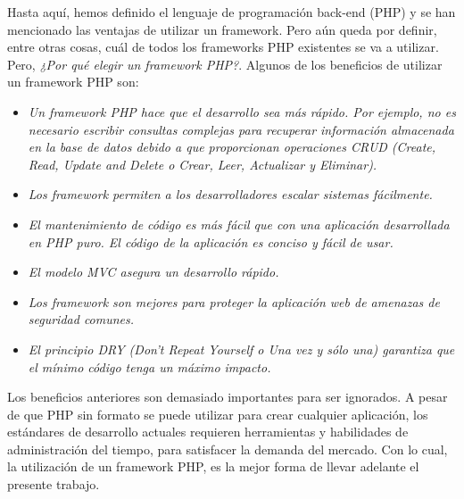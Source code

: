 \documentclass[11pt,oneside]{book}
\begin{document}
Hasta aquí, hemos definido el lenguaje de programación back-end (PHP) y se han mencionado las ventajas de utilizar un framework. Pero aún queda por definir, entre otras cosas, cuál de todos los frameworks PHP existentes se va a utilizar. Pero, \textit{¿Por qué elegir un framework PHP?}. Algunos de los beneficios de utilizar un framework PHP son:
\begin{itemize}
\item \textit{Un framework PHP hace que el desarrollo sea más rápido. Por ejemplo, no es necesario escribir consultas complejas para recuperar información almacenada en la base de datos debido a que proporcionan operaciones CRUD (Create, Read, Update and Delete o Crear, Leer, Actualizar y Eliminar).}

\item \textit{Los framework permiten a los desarrolladores escalar sistemas fácilmente.}

\item \textit{El mantenimiento de código es más fácil que con una aplicación desarrollada en PHP puro. El código de la aplicación es conciso y fácil de usar.}

\item \textit{El modelo MVC asegura un desarrollo rápido.}

\item \textit{Los framework son mejores para proteger la aplicación web de amenazas de seguridad comunes.}

\item \textit{El principio DRY (Don't Repeat Yourself o Una vez y sólo una) garantiza que el mínimo código tenga un máximo impacto.}
\end{itemize}

Los beneficios anteriores son demasiado importantes para ser ignorados. A pesar de que PHP sin formato se puede utilizar para crear cualquier aplicación, los estándares de desarrollo actuales requieren herramientas y habilidades de administración del tiempo, para satisfacer la demanda del mercado. Con lo cual, la utilización de un framework PHP, es la mejor forma de llevar adelante el presente trabajo.
\end{document}
